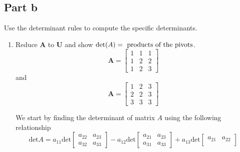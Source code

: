 \subsection{Part b}
Use the determinant rules to compute the specific determinants.
\begin{enumerate}[label=\arabic*.]
    \item Reduce $\mathbf{A}$ to $\mathbf{U}$ and show $\text{det}(A) = \text{
            products of the pivots}$.
        \begin{equation}
            \mathbf{A} = 
            \begin{bmatrix}
                1       &       1       &       1   \\
                1       &       2       &       2   \\
                1       &       2       &       3
            \end{bmatrix}
        \end{equation}
        and
        \begin{equation}
            \mathbf{A} =
            \begin{bmatrix}
                1       &       2       &       3   \\
                2       &       2       &       3   \\
                3       &       3       &       3
            \end{bmatrix}
        \end{equation}
        \begin{mdframed}[style=MyFrame]
            We start by finding the determinant of matrix $A$ using the
            following relationship
            \begin{equation}
                \text{det}A = 
                a_{11} \text{det}
                \begin{bmatrix}
                    a_{22}      &   a_{23}  \\
                    a_{32}      &   a_{33}
                \end{bmatrix}
                -
                a_{12} \text{det}
                \begin{bmatrix}
                    a_{21}      &   a_{23}  \\
                    a_{31}      &   a_{33}
                \end{bmatrix}
                +
                a_{13} \text{det}
                \begin{bmatrix}
                    a_{21}      &   a_{22}  \\

\end{bmatrix}
\end{equation}
\end{mdframed}
\end{enumerate}
